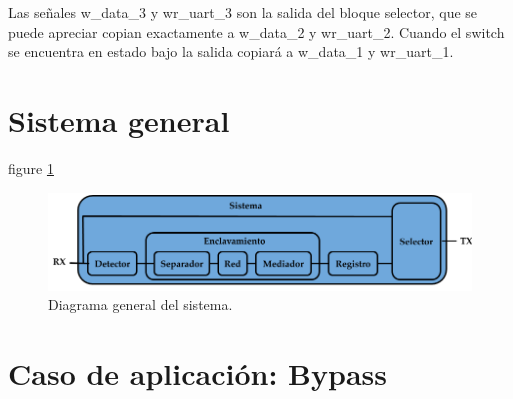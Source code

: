 			
	Las señales w\_data\_3 y wr\_uart\_3 son la salida del bloque selector, que se puede apreciar copian exactamente a w\_data\_2 y wr\_uart\_2. Cuando el switch se encuentra en estado bajo la salida copiará a w\_data\_1 y wr\_uart\_1.

\section{Sistema general}

	figure \ref{fig:Diagrama_general}
	
	\begin{figure}[h]
	\centering
	\includegraphics[scale=0.45]{./Figures/Diagrama_general}
		\caption{Diagrama general del sistema.}
		\label{fig:Diagrama_general}
	\end{figure}
	

\section{Caso de aplicación: Bypass}



